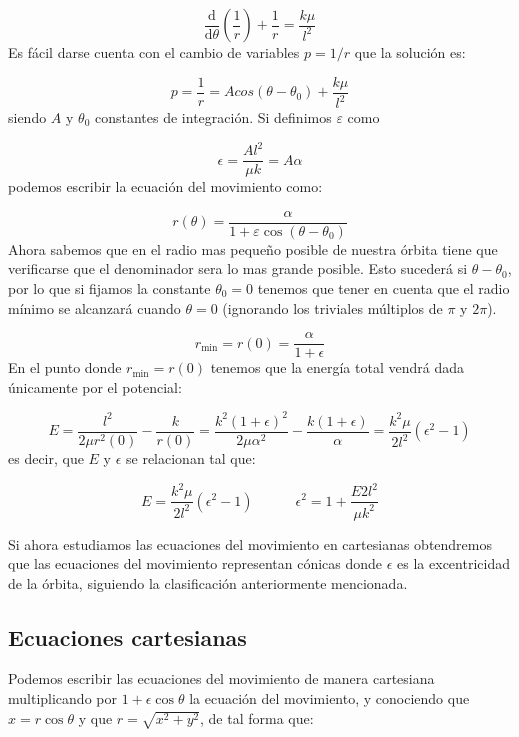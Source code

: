 \documentclass[12pt,a4paper]{book}
\newcommand{\parentesis}[1]{\left( #1  \right)}
\newcommand{\D}{\mathrm{d}}
\begin{document}
$$ \dfrac{\D}{\D \theta} \parentesis{\frac{1}{r}} + \dfrac{1}{r} = \dfrac{k \mu}{l^2} $$
Es fácil darse cuenta con el cambio de variables $p = 1/r$ que la solución es:

$$
p = \dfrac{1}{r} = A cos(\theta - \theta_0) + \dfrac{k \mu }{l^2}
$$
siendo $A$ y $\theta_0$ constantes de integración. Si definimos $\varepsilon$ como

\begin{equation}
\epsilon = \dfrac{A l^2}{\mu k} = A \alpha
\end{equation}
podemos escribir la ecuación del movimiento como:

\begin{equation}
r(\theta) = \dfrac{\alpha}{1 + \varepsilon \cos (\theta - \theta_0)}
\end{equation}
Ahora sabemos que en el radio mas pequeño posible de nuestra órbita tiene que verificarse que el denominador sera lo mas grande posible. Esto sucederá si $\theta-\theta_0$, por lo que si fijamos la constante $\theta_0 = 0$ tenemos que tener en cuenta que el radio mínimo se alcanzará cuando $\theta  =0 $ (ignorando los triviales múltiplos de $\pi$ y $2\pi$).

$$ r_{\mathrm{min}} = r(0) =  \dfrac{\alpha}{1+\epsilon}$$
En el punto donde $r_{\mathrm{min}}=r(0)$ tenemos que la energía total vendrá dada únicamente por el potencial:

$$ E = \dfrac{l^2}{2 \mu r^2(0)} - \dfrac{k}{r(0)} = \dfrac{k^2 (1+\epsilon)^2}{2 \mu \alpha^2} - \dfrac{k (1+\epsilon)}{\alpha} = \dfrac{k^2 \mu}{2 l^2} (\epsilon^2-1) $$
es decir, que $E$ y $\epsilon$ se relacionan tal que:

\begin{equation}
E = \dfrac{k^2 \mu}{2 l^2} (\epsilon^2-1) \quad \quad \quad \epsilon^2 = 1 + \dfrac{E 2 l^2}{\mu k^2}
\end{equation}

Si ahora estudiamos las ecuaciones del movimiento en cartesianas obtendremos que las ecuaciones del movimiento representan cónicas donde $\epsilon$ es la excentricidad de la órbita, siguiendo la clasificación anteriormente mencionada.

\subsection{Ecuaciones cartesianas}

Podemos escribir las ecuaciones del movimiento de manera cartesiana multiplicando por $1+\epsilon \cos \theta$ la ecuación del movimiento, y conociendo que $x=r \cos \theta$ y que $r=\sqrt{x^2+y^2}$, de tal forma que:
\end{document}
